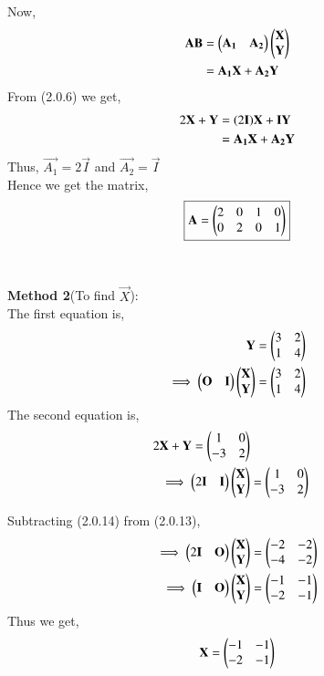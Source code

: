 \documentclass[journal,12pt,twocolumn]{IEEEtran}
\begin{document}
Now, 
\begin{align}
    \vec{A}\vec{B} &= \myvec{\vec{A_{1}}& \vec{A_{2}}}\myvec{\vec{X} \\ \vec{Y}}\notag\\
    &= \vec{A_{1}}\vec{X} + \vec{A_{2}}\vec{Y}
\end{align}
From (2.0.6) we get, 
\begin{align}
    2\vec{X}+\vec{Y} &= (2\vec{I})\vec{X} + \vec{I}\vec{Y}\notag\\
    &=\vec{A_{1}}\vec{X} + \vec{A_{2}}\vec{Y}
\end{align}
Thus, $\vec{A_{1}} = 2\vec{I}$ and $\vec{A_{2}} = \vec{I}$ \\
Hence we get the matrix, 
\begin{align*}
    \boxed{\vec{A} =  \myvec{2 & 0 & 1 & 0 \\ 0 & 2 & 0 & 1}}
\end{align*}\\~\\
\textbf{Method 2}(To find $\vec{X}$):  \\
The first equation is, 
\begin{align}
    \vec{Y} &= \myvec{ 3 & 2 \\ 1 & 4 }\notag\\
    \implies\myvec{\vec{O} & \vec{I}}\myvec{\vec{X} \\ \vec{Y}} &= \myvec{ 3 & 2 \\ 1 & 4 }
\end{align}
The second equation is, 
\begin{align}
    2\vec{X}+\vec{Y} = \myvec{1 & 0 \\ -3 & 2} \notag\\
    \implies\myvec{2\vec{I} & \vec{I}}\myvec{\vec{X} \\ \vec{Y}}
    &= \myvec{1 & 0 \\ -3 & 2}
\end{align}

Subtracting (2.0.14) from (2.0.13),
\begin{align}
    \implies\myvec{2\vec{I} & \vec{O}}\myvec{\vec{X} \\ \vec{Y}}
    &= \myvec{-2 & -2 \\ -4 & -2} \notag\\
    \implies\myvec{\vec{I} & \vec{O}}\myvec{\vec{X} \\ \vec{Y}}
    &= \myvec{-1 & -1 \\ -2 & -1}
    \end{align}
Thus we get,
\begin{align*}
    \vec{X} = \myvec{-1 & -1 \\ -2 & -1}
\end{align*}
\end{document}
